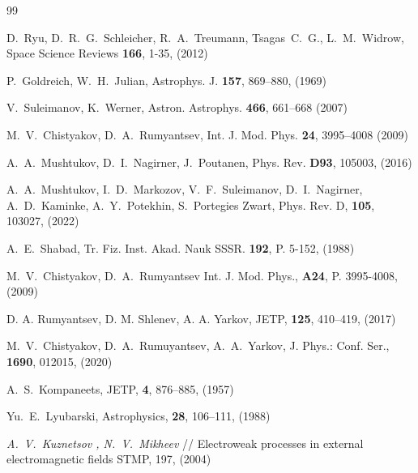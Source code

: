 \documentclass[
aps,%
12pt,%
final,%
notitlepage,%
oneside,%
onecolumn,%
nobibnotes,%
nofootinbib,%
superscriptaddress,%
noshowpacs,%
centertags]%
{revtex4}
\begin{document}
\begin{thebibliography}{99}

D.~Ryu, D.~R.~G.~Schleicher, R.~A.~Treumann, Tsagas~C.~G., L.~M.~Widrow, 
Space Science Reviews
\textbf{166}, 1-35, (2012)


P.~Goldreich,  W.~H.~Julian, Astrophys. J.
\textbf{157}, 869--880, (1969)


V.~Suleimanov, K.~Werner,
Astron. Astrophys.
\textbf{466}, 661--668 (2007)


M.~V.~Chistyakov, D.~A.~Rumyantsev,
Int. J. Mod. Phys.
\textbf{24}, 3995--4008 (2009)


A.~A.~Mushtukov, D.~I.~Nagirner,
	J.~Poutanen,
Phys. Rev.
\textbf{D93}, 105003, (2016)


 A.~A.~Mushtukov, I.~D.~Markozov, V.~F.~Suleimanov, D.~I.~Nagirner, A.~D.~Kaminke, A.~Y.~Potekhin, S.~Portegies Zwart,
Phys. Rev. D,
\textbf{105}, 103027, (2022)

A.~E.~Shabad,
Tr. Fiz. Inst. Akad. Nauk SSSR. 
\textbf{192}, P. 5-152, (1988)

M.~V.~Chistyakov, D.~A.~Rumyantsev
Int. J. Mod. Phys.,
\textbf{A24}, P. 3995-4008, (2009)

D. A. Rumyantsev, D. M. Shlenev, A. A. Yarkov, 
JETP,
\textbf{125}, 410--419, (2017)


 M.~V.~Chistyakov, D.~A.~Rumuyantsev, A.~A.~Yarkov,
J. Phys.: Conf. Ser.,
\textbf{1690}, 012015, (2020)


 A.~S.~Kompaneets,
JETP,
\textbf{4}, 876--885, (1957)


Yu.~E.~Lyubarski, 
Astrophysics,
\textbf{28}, 106--111, (1988)


{\it A.~V.~Kuznetsov , N.~V.~Mikheev} // Electroweak processes in external electromagnetic fields
STMP, 197, (2004)



\end{thebibliography}
\end{document}
